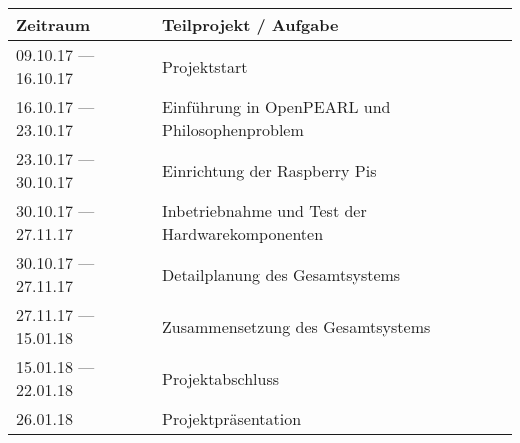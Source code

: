 		\begin{tabular}{|p{5cm}|l|}
			\hline
			\textbf{Zeitraum} & \textbf{Teilprojekt / Aufgabe}\\
			\hline
			09.10.17 --- 16.10.17 & Projektstart\\
			\hline
			16.10.17 --- 23.10.17 & Einführung in OpenPEARL und Philosophenproblem\\
			\hline
			23.10.17 --- 30.10.17 & Einrichtung der Raspberry Pis\\
			\hline
			30.10.17 --- 27.11.17 & Inbetriebnahme und Test der Hardwarekomponenten\\
			\hline
			30.10.17 --- 27.11.17 & Detailplanung des Gesamtsystems\\
			\hline
			27.11.17 --- 15.01.18 & Zusammensetzung des Gesamtsystems\\
			\hline 
			15.01.18 --- 22.01.18 & Projektabschluss\\
			\hline
			26.01.18 & Projektpräsentation\\
			\hline
		\end{tabular}
	